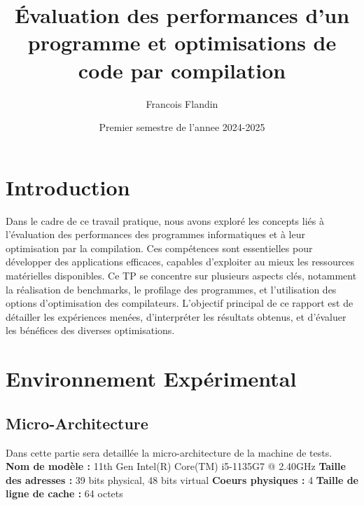 \documentclass{rapport}
\title{Évaluation des performances d’un programme et optimisations de
code par compilation}
\author{Francois Flandin}
\date{Premier semestre de l'annee 2024-2025}
\begin{document}
\maketitle

\clearpage
\tableofcontents

\clearpage

\section{Introduction}
Dans le cadre de ce travail pratique, nous avons exploré les concepts liés à l’évaluation des performances des programmes informatiques et à leur optimisation par la compilation. \newline
Ces compétences sont essentielles pour développer des applications efficaces, capables d'exploiter au mieux les ressources matérielles disponibles. \newline
Ce TP se concentre sur plusieurs aspects clés, notamment la réalisation de benchmarks, le profilage des programmes, et l'utilisation des options d'optimisation des compilateurs.\newline
L'objectif principal de ce rapport est de détailler les expériences menées, d'interpréter les résultats obtenus, et d'évaluer les bénéfices des diverses optimisations. 



\section*{Environnement Expérimental}
\subsection*{Micro-Architecture}
Dans cette partie sera detaillée la micro-architecture de la machine de tests.
\newline\newline
\textbf{Nom de modèle :} 11th Gen Intel(R) Core(TM) i5-1135G7 @ 2.40GHz
\newline
\textbf{Taille des adresses :} 39 bits physical, 48 bits virtual
\newline
\textbf{Coeurs physiques :} 4
\newline
\textbf{Taille de ligne de cache :} 64 octets
\end{document}
